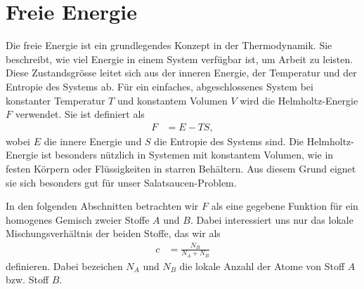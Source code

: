 %
%
%
%
\section{Freie Energie\label{cahnhilliard:section:energie}}

Die freie Energie ist ein grundlegendes Konzept in der Thermodynamik.
%
%
%
Sie beschreibt,
wie viel Energie in einem System verfügbar ist,
um Arbeit zu leisten.
Diese Zustandsgrösse leitet sich aus der inneren Energie,
%
%
der Temperatur und der Entropie des Systems ab.
%
Für ein einfaches,
abgeschlossenes System bei konstanter Temperatur $T$
%
und konstantem Volumen $V$ wird die Helmholtz-Energie $F$ verwendet.
%
%
Sie ist definiert als
\begin{align*}
F
& =
E - TS,
\end{align*}
wobei $E$ die innere Energie und $S$ die Entropie des Systems sind.
Die Helmholtz-Energie ist besonders nützlich in Systemen mit konstantem Volumen,
wie in festen Körpern oder Flüssigkeiten in starren Behältern.
Aus diesem Grund eignet sie sich besonders gut für unser Salatsaucen-Problem.

In den folgenden Abschnitten betrachten wir $F$ als eine gegebene Funktion
für ein homogenes Gemisch zweier Stoffe $A$ und $B$.
%
Dabei interessiert uns nur das lokale Mischungsverhältnis der beiden Stoffe,
das wir als
\begin{align*}
c
& =
\frac{N_B}{N_A + N_B}
\end{align*}
definieren.
Dabei bezeichen $N_A$ und $N_B$ die lokale Anzahl der Atome von Stoff $A$
bzw. Stoff $B$.

